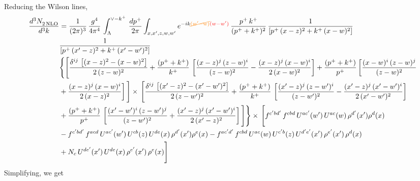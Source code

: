 \documentclass[9pt]{article}
\numberwithin{equation}{section}
\begin{document}
Reducing the Wilson lines, 
\begin{align}
    \frac{d^{3}N_{2\,\rm NLO}^{\rm}}{d^{3}k}  & = \frac{1}{(2\pi)^{3}}\, \frac{g^{4}}{4\pi^{4}}\,\int_{\Lambda}^{\vee-k^{+}}\, \frac{dp^{+}}{2\pi}\int_{x,x',z,w,w^{\prime}} e^{-ik{\color{orange}\cancel{(w^{\prime}-w)}}{\color{red}(w-w^{\prime})}}\,\frac{p^{+}\,k^{+}}{(p^{+}+k^{+})^{2}}\, \frac{1}{\left[p^{+}\,(x-z)^{2}+k^{+}\,(x-w)^{2}\right]}\,\notag \\ & \frac{1}{\left[p^{+}\,(x'-z)^{2}+k^{+}\,(x'-w')^{2}\right]}\notag \\ & \Bigg\{\Bigg[\frac{\delta^{ij}\, \left[(x-z)^{2}-(x-w)^{2}\right]}{2\,(z-w)^{2}} + \frac{(p^{+}+k^{+})}{k^{+}}\, \left[\frac{(x-z)^{j}\,(z-w)^{i}}{(z-w)^{2}}-\frac{(x-z)^{j}\,(x-w)^{i}}{2\,(x-w)^{2}}\right]+\frac{(p^{+}+k^{+})}{p^{+}}\,\bigg[\frac{(x-w)^{i}\,(z-w)^{j}}{(z-w)^{2}}\notag \\ & +\frac{(x-z)^{j}\,(x-w)^{i}}{2\,(x-z)^{2}}\bigg]\,\Bigg]\times\, \Bigg[\frac{\delta^{ij}\, \left[(x'-z)^{2}-(x'-w')^{2}\right]}{2\,(z-w')^{2}}+ \frac{(p^{+}+k^{+})}{k^{+}}\, \left[\frac{(x'-z)^{j}\,(z-w')^{i}}{(z-w')^{2}}-\frac{(x'-z)^{j}\,(x'-w')^{i}}{2\,(x'-w')^{2}}\right]\notag \\ & +\frac{(p^{+}+k^{+})}{p^{+}}\,\left[\frac{(x'-w')^{i}\,(z-w')^{j}}{(z-w')^{2}} +\frac{(x'-z)^{j}\,(x'-w')^{i}}{2\,(x'-z)^{2}}\right] \Bigg] \Bigg\} \times\,  \Bigg[f^{c'bd'}\,f^{cbd}\, U^{ac'}(w')\,U^{ac}(w)\,\rho^{d'}(x')\rho^{d}(x)\notag \\ & - f^{c'bd'}\,f^{acd}\,U^{ac'}(w')\,U^{cb}(z)\,U^{de}(x)\,\rho^{d'}(x')\rho^{e}(x) -f^{ac'd'}\,f^{cbd}\,U^{ac}(w)\,U^{c'b}(z)\,U^{d'e'}(x')\,\rho^{e'}(x')\,\rho^{d}(x)\notag \\ & +N_{c}\,U^{de'}(x')\,U^{de}(x)\,\rho^{e'}(x')\,\rho^{e}(x)\Bigg]
\end{align}
Simplifying, we get
\end{document}
